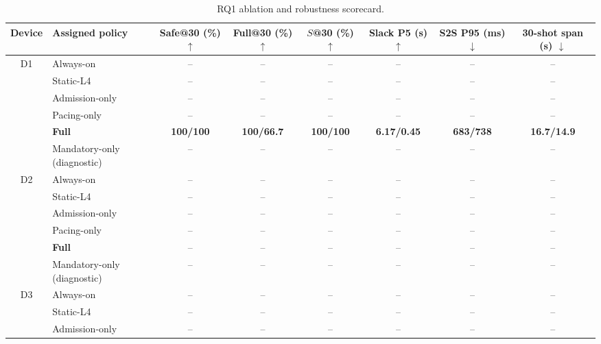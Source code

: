 \begin{table}[t]
  \centering
  \caption{RQ1 ablation and robustness scorecard.}
  \label{tab:rq1_ablation}
  {\small
  \setlength{\tabcolsep}{4.0pt}%
  \renewcommand{\arraystretch}{1.08}%
  \begin{tabular}{@{}c l c c c c c c@{}}
    \toprule
    \textbf{Device} & \textbf{Assigned policy} &
    \makecell{\textbf{Safe@30}\\(\%) $\uparrow$} &
    \makecell{\textbf{Full@30}\\(\%) $\uparrow$} &
    \makecell{\textbf{$S$@30}\\(\%) $\uparrow$} &
    \makecell{\textbf{Slack P5}\\(s) $\uparrow$} &
    \makecell{\textbf{S2S P95}\\(ms) $\downarrow$} &
    \makecell{\textbf{30-shot span}\\(s) $\downarrow$} \\
    \midrule
    \multirow{6}{*}{D1}
      & Always-on & -- & -- & -- & -- & -- & -- \\
      & Static-L4 & -- & -- & -- & -- & -- & -- \\
      & Admission-only & -- & -- & -- & -- & -- & -- \\
      & Pacing-only & -- & -- & -- & -- & -- & -- \\
    \rowcolor{bgGray}
      & \textbf{Full} & \textbf{100/100} & \textbf{100/66.7} &
        \textbf{100/100} & \textbf{6.17/0.45} &
        \textbf{683/738} & \textbf{16.7/14.9} \\
      & Mandatory-only (diagnostic) & -- & -- & -- & -- & -- & -- \\
    \midrule
    \multirow{6}{*}{D2}
      & Always-on & -- & -- & -- & -- & -- & -- \\
      & Static-L4 & -- & -- & -- & -- & -- & -- \\
      & Admission-only & -- & -- & -- & -- & -- & -- \\
      & Pacing-only & -- & -- & -- & -- & -- & -- \\
    \rowcolor{bgGray}
      & \textbf{Full} & -- & -- & -- & -- & -- & -- \\
      & Mandatory-only (diagnostic) & -- & -- & -- & -- & -- & -- \\
    \midrule
    \multirow{6}{*}{D3}
      & Always-on & -- & -- & -- & -- & -- & -- \\
      & Static-L4 & -- & -- & -- & -- & -- & -- \\
      & Admission-only & -- & -- & -- & -- & -- & -- \\

\end{tabular}}
\end{table}
